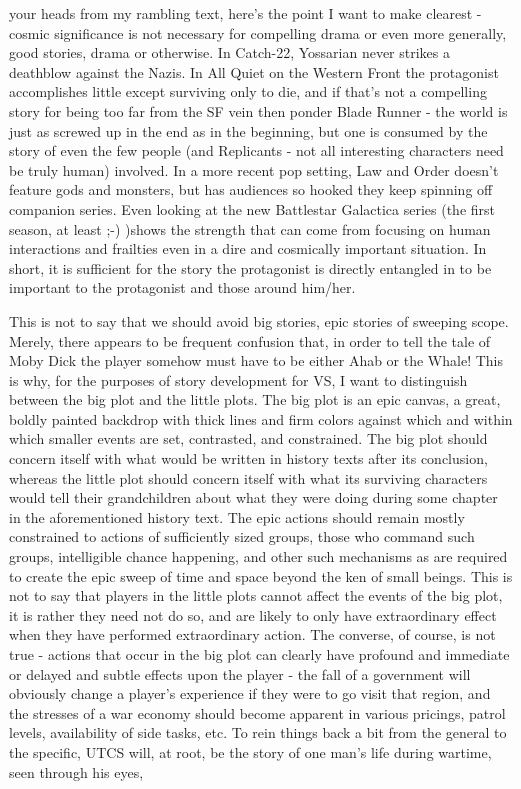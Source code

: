 your heads from my rambling text, here's the point I want to make
clearest - cosmic significance is not necessary for compelling drama
or even more generally, good stories, drama or otherwise. In Catch-22,
Yossarian never strikes a deathblow against the Nazis. In All Quiet on
the Western Front the protagonist accomplishes little except surviving
only to die, and if that's not a compelling story for being too far
from the SF vein then ponder Blade Runner - the world is just as
screwed up in the end as in the beginning, but one is consumed by the
story of even the few people (and Replicants - not all interesting
characters need be truly human) involved. In a more recent pop
setting, Law and Order doesn't feature gods and monsters, but has
audiences so hooked they keep spinning off companion series. Even
looking at the new Battlestar Galactica series (the first season, at
least ;-) )shows the strength that can come from focusing on human
interactions and frailties even in a dire and cosmically important
situation. In short, it is sufficient for the story the protagonist is
directly entangled in to be important to the protagonist and those
around him/her.

This is not to say that we should avoid big stories, epic stories of
sweeping scope. Merely, there appears to be frequent confusion that,
in order to tell the tale of Moby Dick the player somehow must have to
be either Ahab or the Whale! This is why, for the purposes of story
development for VS, I want to distinguish between the big plot and the
little plots. The big plot is an epic canvas, a great, boldly painted
backdrop with thick lines and firm colors against which and within
which smaller events are set, contrasted, and constrained. The big
plot should concern itself with what would be written in history texts
after its conclusion, whereas the little plot should concern itself
with what its surviving characters would tell their grandchildren
about what they were doing during some chapter in the aforementioned
history text. The epic actions should remain mostly constrained to
actions of sufficiently sized groups, those who command such groups,
intelligible chance happening, and other such mechanisms as are
required to create the epic sweep of time and space beyond the ken of
small beings. This is not to say that players in the little plots
cannot affect the events of the big plot, it is rather they need not
do so, and are likely to only have extraordinary effect when they have
performed extraordinary action. The converse, of course, is not true -
actions that occur in the big plot can clearly have profound and
immediate or delayed and subtle effects upon the player - the fall of
a government will obviously change a player's experience if they were
to go visit that region, and the stresses of a war economy should
become apparent in various pricings, patrol levels, availability of
side tasks, etc. To rein things back a bit from the general to the
specific, UTCS will, at root, be the story of one man's life during
wartime, seen through his eyes,

